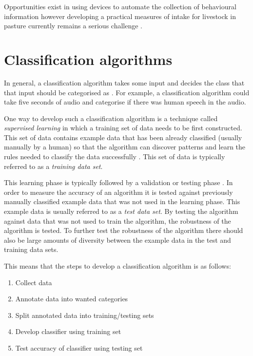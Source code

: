 Opportunities exist in using devices to automate the collection of behavioural information however developing a practical measures of intake for livestock in pasture currently remains a serious challenge \cite{Cottle2013}. 


\section{Classification algorithms}
In general, a classification algorithm takes some input and decides the class that that input should be categorised as \cite{xu2005survey}. For example, a classification algorithm could take five seconds of audio and categorise if there was human speech in the audio. 

One way to develop such a classification algorithm is a technique called \textit{supervised learning} in which a training set of data needs to be first constructed. This set of data contains example data that has been already classified (usually manually by a human) so that the algorithm can discover patterns and learn the rules needed to classify the data successfully \cite{mohri2012foundations}. This set of data is typically referred to as a \textit{training data set}. 

This learning phase is typically followed by a validation or testing phase \cite{mohri2012foundations}. In order to measure the accuracy of an algorithm it is tested against previously manually classified example data that was not used in the learning phase. This example data is usually referred to as a \textit{test data set}. By testing the algorithm against data that was not used to train the algorithm, the robustness of the algorithm is tested. To further test the robustness of the algorithm there should also be large amounts of diversity between the example data in the test and training data sets.

This means that the steps to develop a classification algorithm is as follows:

\begin{enumerate}
\item Collect data

\item Annotate data into wanted categories

\item Split annotated data into training/testing sets

\item Develop classifier using training set

\item Test accuracy of classifier using testing set
\end{enumerate}

